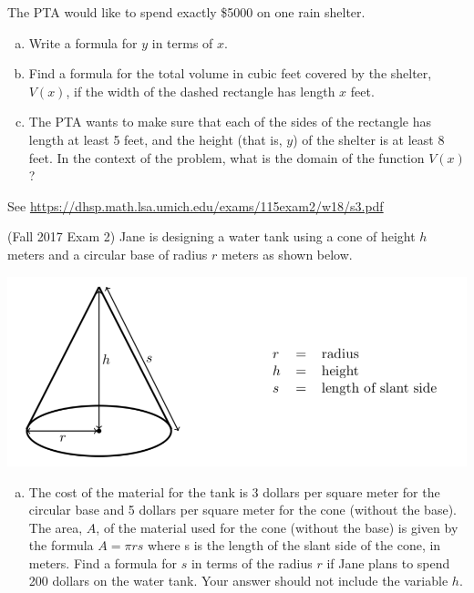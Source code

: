 \documentclass[11pt]{exam}
\begin{document}
\begin{questions}
The PTA would like to spend exactly \$5000 on one rain shelter.
\begin{enumerate}[(a)]
\item Write a formula for $y$ in terms of $x$.
\item Find a formula for the total volume in cubic feet covered by the shelter, $V (x)$, if the width of the dashed rectangle has length $x$ feet.
\item The PTA wants to make sure that each of the sides of the rectangle has length at least 5 feet, and the height (that is, $y$) of the shelter is at least 8 feet. In the context of the problem, what is the domain of the function $V (x)$?
\end{enumerate}
\begin{solution}
  See \href{https://dhsp.math.lsa.umich.edu/exams/115exam2/w18/s3.pdf}{https://dhsp.math.lsa.umich.edu/exams/115exam2/w18/s3.pdf}
\end{solution}
\pagebreak
\question (Fall 2017 Exam 2) %
Jane is designing a water tank using a cone of height $h$ meters and a circular base of radius $r$ meters as shown below.
\begin{center}
  \includegraphics[scale=0.45]{jane.png}
\end{center}
\begin{enumerate}[(a)]
\item The cost of the material for the tank is 3 dollars per square meter for the circular base and 5 dollars per square meter for the cone (without the base). The area, $A$, of the material used for the cone (without the base) is given by the formula $A = \pi rs$ where s is the length of the slant side of the cone, in meters. Find a formula for $s$ in terms of the radius $r$ if Jane plans to spend 200 dollars on the water tank. Your answer should not include the variable $h$.

\end{enumerate}
\end{questions}
\end{document}
